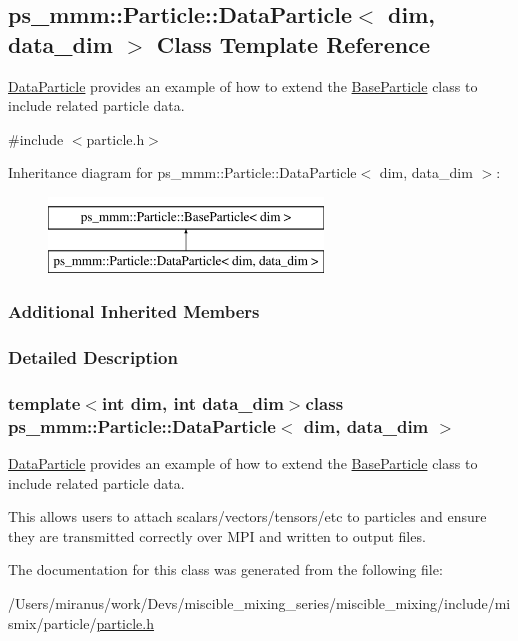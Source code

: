 \hypertarget{classps__mmm_1_1_particle_1_1_data_particle}{}\subsection{ps\+\_\+mmm\+:\+:Particle\+:\+:Data\+Particle$<$ dim, data\+\_\+dim $>$ Class Template Reference}
\label{classps__mmm_1_1_particle_1_1_data_particle}


\hyperlink{classps__mmm_1_1_particle_1_1_data_particle}{Data\+Particle} provides an example of how to extend the \hyperlink{classps__mmm_1_1_particle_1_1_base_particle}{Base\+Particle} class to include related particle data.  




{\ttfamily \#include $<$particle.\+h$>$}

Inheritance diagram for ps\+\_\+mmm\+:\+:Particle\+:\+:Data\+Particle$<$ dim, data\+\_\+dim $>$\+:\begin{figure}[H]
\begin{center}
\leavevmode
\includegraphics[height=2.000000cm]{classps__mmm_1_1_particle_1_1_data_particle}
\end{center}
\end{figure}
\subsubsection*{Additional Inherited Members}


\subsubsection{Detailed Description}
\subsubsection*{template$<$int dim, int data\+\_\+dim$>$class ps\+\_\+mmm\+::\+Particle\+::\+Data\+Particle$<$ dim, data\+\_\+dim $>$}

\hyperlink{classps__mmm_1_1_particle_1_1_data_particle}{Data\+Particle} provides an example of how to extend the \hyperlink{classps__mmm_1_1_particle_1_1_base_particle}{Base\+Particle} class to include related particle data. 

This allows users to attach scalars/vectors/tensors/etc to particles and ensure they are transmitted correctly over M\+P\+I and written to output files. 

The documentation for this class was generated from the following file\+:\begin{DoxyCompactItemize}
\item 
/\+Users/miranus/work/\+Devs/miscible\+\_\+mixing\+\_\+series/miscible\+\_\+mixing/include/mismix/particle/\hyperlink{particle_8h}{particle.\+h}\end{DoxyCompactItemize}
